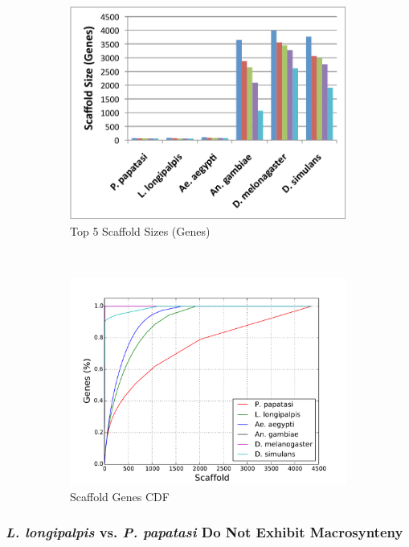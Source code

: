 \begin{figure}[H]
\begin{subfigure}[b]{0.45\textwidth}
    \includegraphics[width=\textwidth]{figures/synteny/top5_scaffold_sizes.pdf}
    \caption{Top 5 Scaffold Sizes (Genes)}
  \end{subfigure}
  ~
  \begin{subfigure}[b]{0.45\textwidth}
    \includegraphics[width=\textwidth]{figures/synteny/gene_scaffold_cdf.pdf}
    \caption{Scaffold Genes CDF}
  \end{subfigure}
  \label{fig:scaffolds}
  \caption{}
\end{figure}

\subsubsection{\emph{L. longipalpis} vs. \emph{P. papatasi} Do Not Exhibit Macrosynteny}

